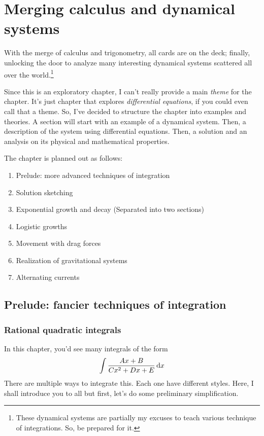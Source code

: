 \chapter{Merging calculus and dynamical systems}
\label{sec:calculus-and-physical-systems}

With the merge of calculus and trigonometry, all cards are on the deck; finally, unlocking the door to analyze many interesting dynamical systems scattered all over the world.\footnote{These dynamical systems are partially my excuses to teach various technique of integrations. So, be prepared for it.}

Since this is an exploratory chapter, I can't really provide a main \emph{theme} for the chapter. It's just chapter that explores \emph{differential equations}, if you could even call that a theme. So, I've decided to structure the chapter into examples and theories. A section will start with an example of a dynamical system. Then, a description of the system using differential equations. Then, a solution and an analysis on its physical and mathematical properties.

The chapter is planned out as follows:
\begin{enumerate}[noitemsep]
	\item Prelude: more advanced techniques of integration
	\item Solution sketching
	\item Exponential growth and decay (Separated into two sections)
	\item Logistic growths
	\item Movement with drag forces
	\item Realization of gravitational systems
	\item Alternating currents
\end{enumerate}

\section{Prelude: fancier techniques of integration}

\subsection{Rational quadratic integrals}

In this chapter, you'd see many integrals of the form
\begin{equation}
	\int \frac{Ax + B}{Cx^2 + Dx + E} \odif{x}
\end{equation}
There are multiple ways to integrate this. Each one have different styles. Here, I shall introduce you to all but first, let's do some preliminary simplification.

